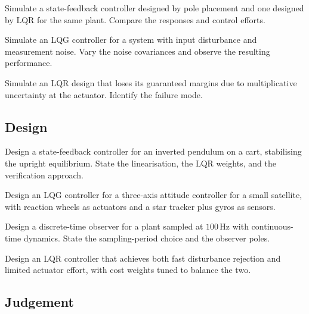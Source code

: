 \begin{exercise}
Simulate a state-feedback controller designed by pole placement and one designed by LQR for the same plant. Compare the responses and control efforts.
\end{exercise}

\begin{exercise}
Simulate an LQG controller for a system with input disturbance and measurement noise. Vary the noise covariances and observe the resulting performance.
\end{exercise}

\begin{exercise}
Simulate an LQR design that loses its guaranteed margins due to multiplicative uncertainty at the actuator. Identify the failure mode.
\end{exercise}

\subsection*{Design}

\begin{exercise}
Design a state-feedback controller for an inverted pendulum on a cart, stabilising the upright equilibrium. State the linearisation, the LQR weights, and the verification approach.
\end{exercise}

\begin{exercise}
Design an LQG controller for a three-axis attitude controller for a small satellite, with reaction wheels as actuators and a star tracker plus gyros as sensors.
\end{exercise}

\begin{exercise}
Design a discrete-time observer for a plant sampled at $100\,\text{Hz}$ with continuous-time dynamics. State the sampling-period choice and the observer poles.
\end{exercise}

\begin{exercise}
Design an LQR controller that achieves both fast disturbance rejection and limited actuator effort, with cost weights tuned to balance the two.
\end{exercise}

\subsection*{Judgement}


